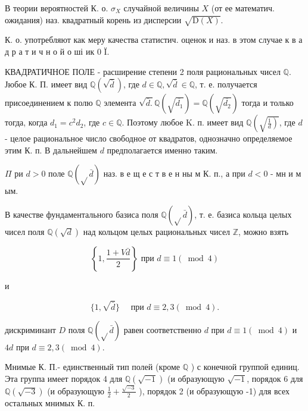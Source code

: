 \documentclass[10pt]{article}
\begin{document}
В теории вероятностей К. о. $\sigma_{X}$ случайной величины $X$ (от ее математич. ожидания) наз. квадратный корень из дисперсии $\sqrt{\mathrm{D}(X)}$.



К. о. употребляют как меру качества статистич. оценок и наз. в этом случае к в а д р а т и ч н о й о ші ик 0 Ï.



КВАДРАТИЧНОЕ ПОЛЕ - расширение степени 2 поля рациональных чисел $\mathbb{Q}$. Јюбое $К$. П. имеет вид $\mathbb{Q}(\sqrt{\bar{d}})$, где $d \in \mathbb{Q}, \sqrt{\bar{d}} \in \mathbb{Q}$, т. е. получается присоединением к полю $\mathbb{Q}$ элемента $\sqrt{\bar{d} .} \mathbb{Q}\left(\sqrt{\overline{d_{1}}}\right)=\mathbb{Q}\left(\sqrt{\overline{d_{2}}}\right)$ тогда и только тогда, когда $d_{1}=c^{2} d_{2}$, где $c \in \mathbb{Q}$. Поэтому любое K. п. имеет вид $\mathbb{Q}\left(\sqrt{\left.\frac{1}{d}\right)}\right.$, где $d$ - целое рациональное число свободное от квадратов, однозначно определяемое этим К. п. В дальнейшем $d$ предполагается именно таким.



$\Pi$ ри $d>0$ поле $\mathbb{Q}(\sqrt{ } \bar{d})$ наз. в е щ е с т в е н ны м К. п., а при $d<0$ - мн и м ым.



В качестве фундаментального базиса поля $\mathbb{Q}(\sqrt{ } \bar{d})$, т. е. базиса кольца целых чисел поля $\mathbb{Q}(\sqrt{d})$ над кольцом целых рациональных чисел $\mathbb{Z}$, можно взять



\[

\left\{1, \frac{1+V \bar{d}}{2}\right\} \text { при } d \equiv 1(\bmod 4)

\]



и



\[

\{1, \sqrt{\bar{d}}\} \quad \text { при } d \equiv 2,3(\bmod 4) .

\]



дискриминант $D$ поля $\mathbb{Q}(\sqrt{ } \bar{d})$ равен соответственно $d$ при $d \equiv 1(\bmod 4)$ и $4 d$ при $d \equiv 2,3(\bmod 4)$.



Мнимые К. П.- единственный тип полей (кроме $\mathbb{Q}$ ) с конечной группой единиц. Эта группа имеет порядок 4 для $\mathbb{Q}(\sqrt{-1})$ (и образующую $\sqrt{-1}$, порядок 6 для $\mathbb{Q}(\sqrt{-3})$ (и образующую $\frac{1}{2}+\frac{\sqrt{-3}}{2}$ ), порядок 2 (и образующую -1) для всех остальных мнимых К. п.
\end{document}
